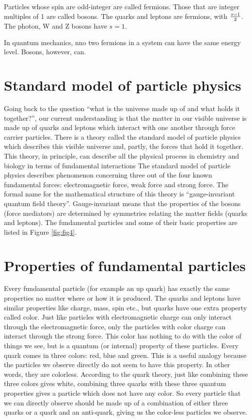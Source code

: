 Particles whose spin are odd-integer
are called fermions.  Those that are integer multiples of 1 are called bosons.  
The quarks and leptons are fermions, with $s= 1 \over 2$.  
The photon, W and Z bosons have $s=1$.

In quantum mechanics, nno two fermions in a system can have the same energy level.  Bosons, however, can.


\section{Standard model of particle physics}
Going back to the question ``what is the universe made up of and what holds it together?'', 
our current understanding is that the matter in our visible universe is made up of quarks and leptons which interact with one another through force carrier particles.  There is a theory called the standard model of particle physics which describes this visible universe and, partly, the forces that hold it together. This theory, in principle, can describe all the physical process in chemistry and biology in terms of fundamental interactions The standard model of particle physics describes phenomenon concerning three out of the four known 
fundamental forces: electromagnetic force, weak force and strong force. The formal name for the mathematical structure of this theory is “gauge-invariant quantum field theory”.  Gauge-invariant means that the properties of the bosons (force mediators) are determined by symmetries relating the matter fields (quarks and leptons). 
The fundamental particles and some of their basic properties are listed in 
Figure \ref{fig:fig4}.




\section{Properties of fundamental particles}
Every fundamental particle (for example an up quark) has exactly the same properties no matter where or how it is produced.   The quarks and leptons have similar properties like charge, mass, spin etc., but quarks have one extra property called color. Just like particles with electromagnetic charge can only interact through the electromagnetic force, only the particles with color charge can interact through the strong force. This color has nothing to do with the color of things we see, but is a quantum (or internal) property of these particles. Every quark comes in three colors: red, blue and green. This is a useful analogy because the particles we observe directly do not seem to have this property. In other words, they are colorless. According to the quark theory, just like combining these three colors gives white, combining three quarks with these three quantum properties gives a particle which does not have any color. So every particle that we can directly observe should be made up of a combination of either three quarks or a quark and an anti-quark, giving us the color-less particles we observe. 

